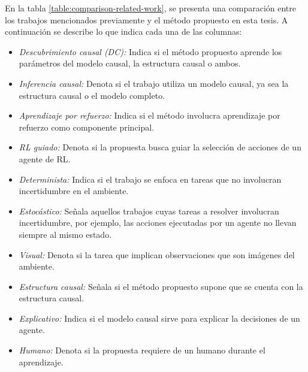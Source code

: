 En la tabla \ref{table:comparison-related-work}, se presenta una comparación entre los trabajos mencionados previamente y el método propuesto en esta tesis. A continuación se describe lo que indica cada una de las columnas:

\begin{itemize}
    \item \textit{Descubrimiento causal (DC):} Indica si el método propuesto aprende los parámetros del modelo causal, la estructura causal o ambos.
    \item \textit{Inferencia causal:} Denota si el trabajo utiliza un modelo causal, ya sea la estructura causal o el modelo completo.
    \item \textit{Aprendizaje por refuerzo:} Indica si el método involucra aprendizaje por refuerzo como componente principal.
    \item \textit{RL guiado:} Denota si la propuesta busca guiar la selección de acciones de un agente de RL.
    \item \textit{Determinista:} Indica si el trabajo se enfoca en tareas que no involucran incertidumbre en el ambiente.
    \item \textit{Estocástico:} Señala aquellos trabajos cuyas tareas a resolver  involucran incertidumbre, por ejemplo, las acciones ejecutadas por un agente no llevan siempre al mismo estado.
    \item \textit{Visual:} Denota si la tarea que implican observaciones que son imágenes del ambiente.
    \item \textit{Estructura causal:} Señala si el método propuesto supone que se cuenta con la estructura causal.
    \item \textit{Explicativo:} Indica si el modelo causal sirve para explicar la decisiones de un agente.
    \item \textit{Humano:} Denota si la propuesta requiere de un humano durante el aprendizaje.
\end{itemize}


